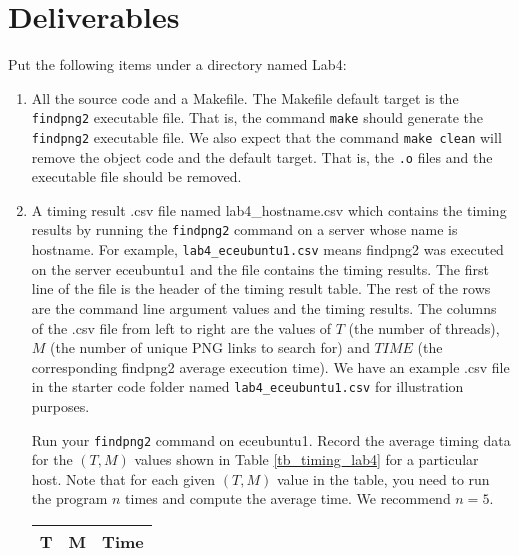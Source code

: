 \section{Deliverables}
\label{sec:lab4:lab}
Put the following items under a directory named Lab4:
\begin{enumerate}
\item All the source code and a Makefile. The Makefile default target is the \verb+findpng2+ executable file. That is, the command \verb+make+ should generate the \verb+findpng2+ executable file. We also expect that the command \verb+make clean+ will remove the object code and the default target. That is, the \verb+.o+ files and the executable file should be removed.
\item A timing result .csv file named lab4\_hostname.csv 
  which contains the timing results by running the \verb+findpng2+ command on a server whose name is hostname. For example, \verb+lab4_eceubuntu1.csv+ means findpng2 was executed on the server eceubuntu1 and the file contains the timing results.
  The first line of the file is the header of the timing result table. The rest of the rows are the command line argument values and the timing results. The columns of the .csv file from left to right are the values of $T$ (the number of threads), $M$ (the number of unique PNG links to search for) and $TIME$ (the corresponding findpng2 average execution time). We have an example .csv file in the starter code folder named \verb+lab4_eceubuntu1.csv+ for illustration purposes.

Run your \verb+findpng2+ command on eceubuntu1. Record the average timing data for the $(T, M)$ values shown in Table \ref{tb_timing_lab4} for a particular host. Note that for each given $(T, M)$ value in the table, you need to run the program $n$ times and compute the average time. We recommend $n=5$.
\begin{table}[h]
\begin{center}
\begin{tabular}{|c|c|c|}
\hline
T     & M    & Time \\ \hline


\end{tabular}
\end{center}
\end{table}
\end{enumerate}

